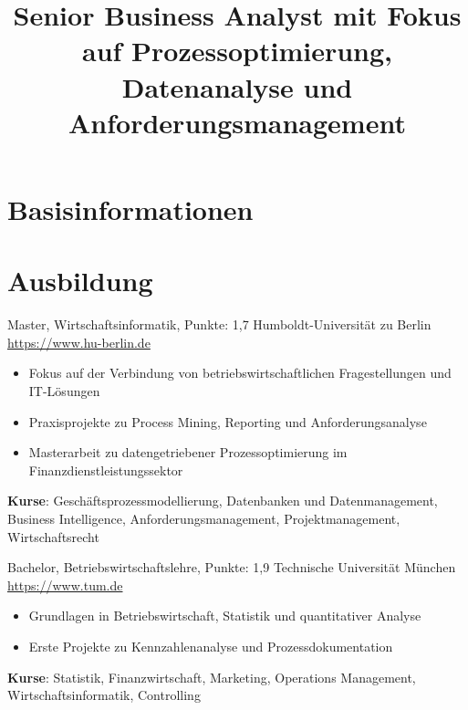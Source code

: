 \documentclass[a4paper, serif, 10pt]{moderncv}
\title{Senior Business Analyst mit Fokus auf Prozessoptimierung, Datenanalyse und Anforderungsmanagement}
\begin{document}
\maketitle

\section{Basisinformationen}

\section{Ausbildung}

        {Master, Wirtschaftsinformatik, Punkte: 1,7}
        {Humboldt-Universität zu Berlin}
        {\url{https://www.hu-berlin.de}}
        {}
        {\begin{itemize}
\item Fokus auf der Verbindung von betriebswirtschaftlichen Fragestellungen und IT-Lösungen
\item Praxisprojekte zu Process Mining, Reporting und Anforderungsanalyse
\item Masterarbeit zu datengetriebener Prozessoptimierung im Finanzdienstleistungssektor
\end{itemize}
\textbf{Kurse}: Geschäftsprozessmodellierung, Datenbanken und Datenmanagement, Business Intelligence, Anforderungsmanagement, Projektmanagement, Wirtschaftsrecht}

        {Bachelor, Betriebswirtschaftslehre, Punkte: 1,9}
        {Technische Universität München}
        {\url{https://www.tum.de}}
        {}
        {\begin{itemize}
\item Grundlagen in Betriebswirtschaft, Statistik und quantitativer Analyse
\item Erste Projekte zu Kennzahlenanalyse und Prozessdokumentation
\end{itemize}
\textbf{Kurse}: Statistik, Finanzwirtschaft, Marketing, Operations Management, Wirtschaftsinformatik, Controlling}
\end{document}
